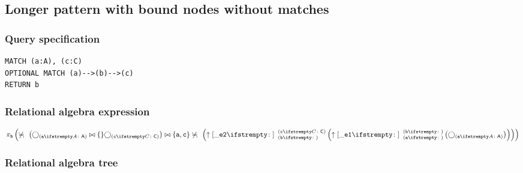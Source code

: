 
\subsection{Longer pattern with bound nodes without matches}

\subsubsection*{Query specification}

\begin{lstlisting}
MATCH (a:A), (c:C)
OPTIONAL MATCH (a)-->(b)-->(c)
RETURN b
\end{lstlisting}

\subsubsection*{Relational algebra expression}

$\projection{\var{b}} \left(\alldifferent{} \left(\getvertices{a}{A} \join \{\} \getvertices{c}{C}\right) \join \{\var{a}, \var{c}\} \alldifferent{} \left(\expandout{\_e2}{}{b}{c}{C} \left(\expandout{\_e1}{}{a}{b}{} \left(\getvertices{a}{A}\right)\right)\right)\right)$

\subsubsection*{Relational algebra tree}

